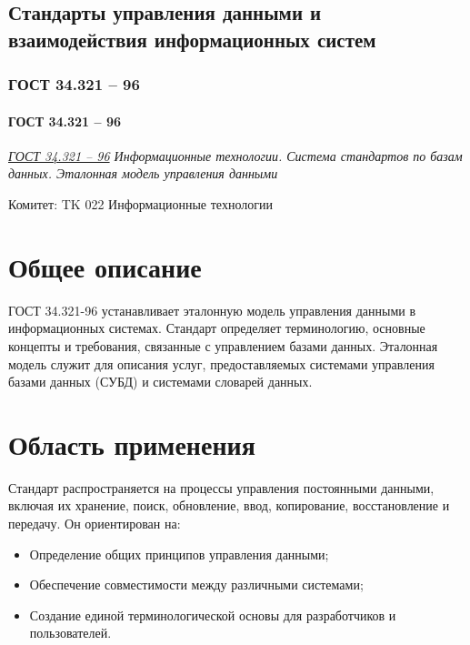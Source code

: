 
\subsection{Стандарты управления данными и взаимодействия информационных систем}
\subsubsection{ГОСТ 34.321 -- 96}
\paragraph{ГОСТ 34.321 -- 96}
\emph{\href{https://internet-law.ru/gosts/gost/6808/}{ГОСТ 34.321 -- 96}
Информационные технологии.
Система стандартов по базам данных.
Эталонная модель управления данными
}
\par
Комитет: TK 022 Информационные технологии
\section*{Общее описание}
ГОСТ 34.321-96 устанавливает эталонную модель управления данными в информационных системах. Стандарт определяет терминологию, основные концепты и требования, связанные с управлением базами данных. Эталонная модель служит для описания услуг, предоставляемых системами управления базами данных (СУБД) и системами словарей данных.

\section*{Область применения}
Стандарт распространяется на процессы управления постоянными данными, включая их хранение, поиск, обновление, ввод, копирование, восстановление и передачу. Он ориентирован на:
\begin{itemize}
    \item Определение общих принципов управления данными;
    \item Обеспечение совместимости между различными системами;
    \item Создание единой терминологической основы для разработчиков и пользователей.
\end{itemize}

